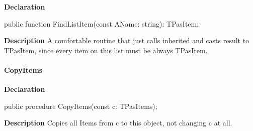 \documentclass{report}
\newif\ifpdf
\begin{document}
\label{PasDoc_Items.TPasItems-FindListItem}
\begin{list}{}{
\setlength{\itemindent}{0cm}
\setlength{\listparindent}{0cm}
\setlength{\leftmargin}{\evensidemargin}
\addtolength{\leftmargin}{\tmplength}
\settowidth{\labelsep}{X}
\addtolength{\leftmargin}{\labelsep}
\setlength{\labelwidth}{\tmplength}
}
\item[\textbf{Declaration}\hfill]
\ifpdf
\begin{flushleft}
\fi
\begin{ttfamily}
public function FindListItem(const AName: string): TPasItem;\end{ttfamily}

\ifpdf
\end{flushleft}
\fi

\par
\item[\textbf{Description}]
A comfortable routine that just calls inherited and casts result to TPasItem, since every item on this list must be always TPasItem.

\end{list}
\paragraph*{CopyItems}\hspace*{\fill}

\label{PasDoc_Items.TPasItems-CopyItems}
\begin{list}{}{
\setlength{\itemindent}{0cm}
\setlength{\listparindent}{0cm}
\setlength{\leftmargin}{\evensidemargin}
\addtolength{\leftmargin}{\tmplength}
\settowidth{\labelsep}{X}
\addtolength{\leftmargin}{\labelsep}
\setlength{\labelwidth}{\tmplength}
}
\item[\textbf{Declaration}\hfill]
\ifpdf
\begin{flushleft}
\fi
\begin{ttfamily}
public procedure CopyItems(const c: TPasItems);\end{ttfamily}

\ifpdf
\end{flushleft}
\fi

\par
\item[\textbf{Description}]
Copies all Items from c to this object, not changing c at all.

\end{list}
\end{document}
